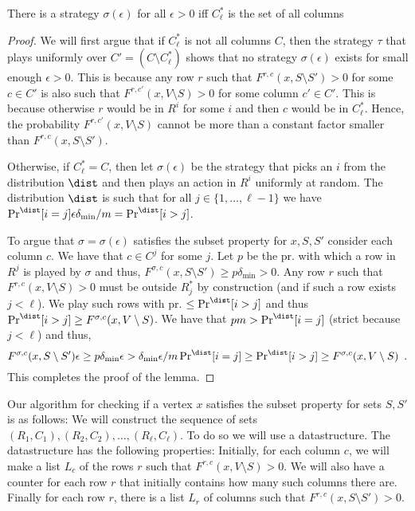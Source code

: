 \begin{lemma}
There is a strategy $\sigma(\epsilon)$ for all $\epsilon>0$ iff $C_{\ell}^*$ is the set of all columns
\end{lemma}
\begin{proof}
We will first argue that if $C_{\ell}^{*}$ is not all columns $C$, then the strategy $\tau$ that plays uniformly over $C'=(C\setminus C_{\ell}^*)$ shows that no strategy $\sigma(\epsilon)$ exists for small enough $\epsilon>0$. This is because any row $r$ such that $F^{r,c}(x,S\setminus S')>0$ for some $c\in C'$ is also such that $F^{r,c'}(x,V\setminus S)>0$ for some column $c'\in C'$. This is because otherwise $r$ would be in $R^i$ for some $i$ and then $c$ would be in $C_{\ell}^*$. Hence, the probability $F^{r,c'}(x,V\setminus S)$ cannot be more than a constant factor smaller than $F^{r,c}(x,S\setminus S')$.


Otherwise, if $C_{\ell}^*=C$, then let $\sigma(\epsilon)$ be the strategy that picks an $i$ from the distribution $\dist$ and then plays an action in $R^i$ uniformly at random. The distribution $\dist$ is such that for all $j\in \{1,\dots,\ell-1\}$ we have $\Pr^{\dist}[i=j]\epsilon\delta_{\min}/m=\Pr^{\dist}[i>j]$. 

To argue that $\sigma=\sigma(\epsilon)$ satisfies the subset property for $x,S,S'$
consider each column $c$. We have that $c\in C^j$ for some $j$. 
Let $p$ be the pr. with which a row in $R^j$ is played by $\sigma$ and thus, $F^{\sigma,c}(x,S\setminus S')\geq p\delta_{\min}>0$.
Any row $r$ such that $F^{r,c}(x,V\setminus S)>0$ must be outside $R^*_j$ by construction (and if such a row exists $j<\ell$). 
We play such rows with pr. $\leq \Pr^{\dist}[i>j]$ and thus $\Pr^{\dist}[i>j]\geq F^{\sigma,c}(x,V\setminus S)$.
We have that $pm>\Pr^{\dist}[i=j]$ (strict because $j<\ell$) and thus, \[
F^{\sigma,c}(x,S\setminus S')\epsilon\geq p\delta_{\min}\epsilon>\delta_{\min}\epsilon/m\Pr^{\dist}\nolimits[i=j]\geq 
\Pr^{\dist}\nolimits[i>j]\geq F^{\sigma,c}(x,V\setminus S) \enspace .\]
This completes the proof of the lemma.\end{proof}


Our algorithm for checking if a vertex $x$ satisfies the subset property for sets $S,S'$ is as follows:
We will construct the sequence of sets $(R_1,C_1),(R_2,C_2),\dots,(R_{\ell},C_{\ell})$.
To do so we will use a datastructure.
The datastructure has the following properties:
Initially, for each column $c$, we will make a list $L_c$ of the rows $r$ such that $F^{r,c}(x,V\setminus S)>0$.
We will also have a counter for each row $r$ that initially contains how many such columns there are.
Finally for each row $r$, there is a list $L_r$ of columns such that $F^{r,c}(x,S\setminus S')>0$.

